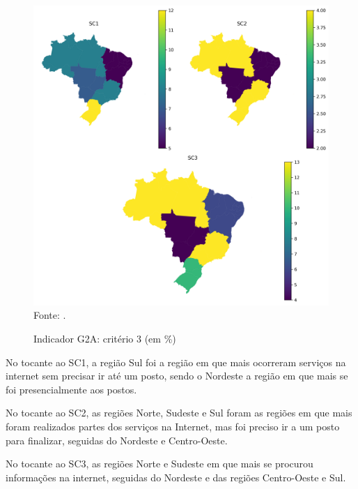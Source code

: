\begin{figure}[H]
	\centering
	\caption{Indicador G2A: critério 3 (em \%)}
	\includegraphics[width=1\linewidth]{figuras/mapa_coropletico_tic_domicilios_2024_g2a_3.png}
	\label{fig:mapa_coropletico_tic_domicilios_2024_g2a_3}
	\footnotesize{Fonte: \cite{tic_domicilios_2024_g2a}.}
\end{figure}

No tocante ao SC1, a região Sul foi a região em que mais ocorreram serviços na internet sem precisar ir até um posto, sendo o Nordeste a região em que mais se foi presencialmente aos postos.

No tocante ao SC2, as regiões Norte, Sudeste e Sul foram as regiões em que mais foram realizados partes dos serviços na Internet, mas foi preciso ir a um posto para finalizar, seguidas do Nordeste e Centro-Oeste.

No tocante ao SC3, as regiões Norte e Sudeste em que mais se procurou informações na internet, seguidas do Nordeste e das regiões Centro-Oeste e Sul.

